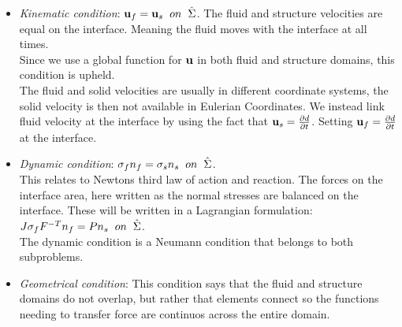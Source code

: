 \begin{itemize}
\item \textit{Kinematic condition}: $\bold{u}_f = \bold{u}_s  \hspace{2mm} on \hspace{2mm} \hat{\Sigma}$. The fluid and structure velocities are equal on the interface. Meaning the fluid moves with the interface at all times. \\
Since we use a global function for $\bold{u}$ in both fluid and structure domains, this condition is upheld.\\ 
The fluid and solid velocities are usually in different coordinate systems, the solid velocity is then not available in Eulerian Coordinates. We instead link fluid velocity at the interface by using the fact that $\bold{u}_s = \frac{\partial d}{\partial t}$. Setting $\bold{u}_f = \frac{\partial d}{\partial t}$ at the interface.

\item \textit{Dynamic condition}: $  \sigma_f n_f = \sigma_s n_s \hspace{2mm} on  \hspace{2mm}\hat{\Sigma}   $. \\
	This relates to Newtons third law of action and reaction. The forces on the interface area, here written as the normal stresses are balanced on the interface. These will be written in a Lagrangian formulation: \\
	$J\sigma_f F^{-T} n_f = P n_s \hspace{2mm} on  \hspace{2mm}\hat{\Sigma} $. \\
	The dynamic condition is a Neumann condition that belongs to both subproblems.
	
\item \textit{Geometrical condition}: This condition says that the fluid and structure domains do not overlap, but rather that elements connect so the functions needing to transfer force are continuos across the entire domain.
\end{itemize}


